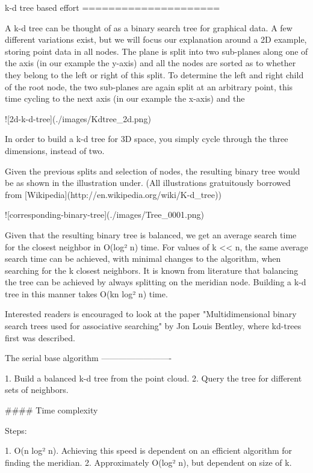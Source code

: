 

k-d tree based effort
=====================

A k-d tree can be thought of as a binary search tree for graphical data. A few different variations exist, but we will focus our explanation around a 2D example, storing point data in all nodes. The plane is split into two sub-planes along one of the axis (in our example the y-axis) and all the nodes are sorted as to whether they belong to the left or right of this split. To determine the left and right child of the root node, the two sub-planes are again split at an arbitrary point, this time cycling to the next axis (in our example the x-axis) and the

![2d-k-d-tree](./images/Kdtree_2d.png)

In order to build a k-d tree for 3D space, you simply cycle through the three dimensions, instead of two.

Given the previous splits and selection of nodes, the resulting binary tree would be as shown in the illustration under. (All illustrations gratuitously borrowed from [Wikipedia](http://en.wikipedia.org/wiki/K-d_tree))

![corresponding-binary-tree](./images/Tree_0001.png)

Given that the resulting binary tree is balanced, we get an average search time for the closest neighbor in O(log² n) time. For values of k << n, the same average search time can be achieved, with minimal changes to the algorithm, when searching for the k closest neighbors. It is known from literature that balancing the tree can be achieved by always splitting on the meridian node. Building a k-d tree in this manner takes O(kn log² n) time.

Interested readers is encouraged to look at the paper "Multidimensional binary search trees used for associative searching" by Jon Louis Bentley, where kd-trees first was described.


The serial base algorithm
-------------------------

1. Build a balanced k-d tree from the point cloud.
2. Query the tree for different sets of neighbors.

#### Time complexity

Steps:

1. O(n log² n). Achieving this speed is dependent on an efficient algorithm for finding the meridian.
2. Approximately O(log² n), but dependent on size of k.

